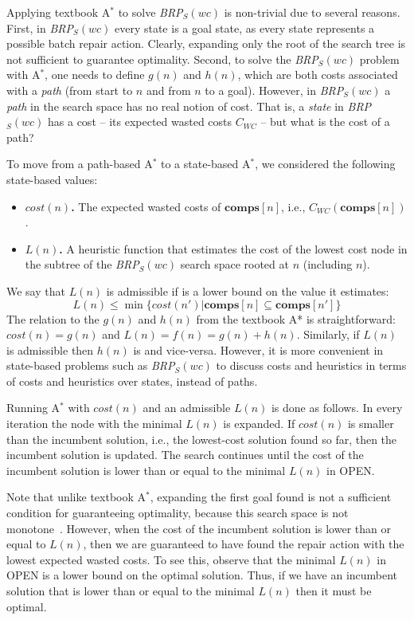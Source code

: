 \documentclass[review]{elsarticle}
\newcommand{\astar}{A$^*$}
\newcommand{\brpswc}{\textit{BRP$_S(wc)$}}
\newcommand{\comps}{\textbf{comps}}
\begin{document}
Applying textbook \astar{} to solve \brpswc{} is non-trivial due to several reasons. First, in \brpswc{} every state is a goal state, as every state represents a possible batch repair action. Clearly, expanding only the root of the search tree is not sufficient to guarantee optimality. 
Second, to solve the \brpswc{} problem with \astar{}, one needs to define $g(n)$ and $h(n)$, which are both costs associated with a \emph{path} (from start to $n$ and from $n$ to a goal). However, in \brpswc{} a \emph{path} in the search space has no real notion of cost. That is, a  \emph{state} in \brpswc{} has a cost -- its expected wasted costs $C_{WC}$ -- but what is the cost of a path?

To move from a path-based \astar{} to a state-based \astar{}, we considered the following state-based values:
\begin{itemize}
    \item \textbf{$cost(n)$.} The expected wasted costs of $\comps[n]$, i.e., $C_{WC}(\comps[n])$.
    \item \textbf{$L(n)$.} A heuristic function that estimates the cost of the lowest cost node in the subtree of the \brpswc{} search space rooted at $n$ (including $n$). 
\end{itemize}
We say that $L(n)$ is admissible if is a lower bound on the value it estimates: \begin{equation}
 L(n)\leq \min \{cost(n')| \comps[n] \subseteq \comps[n'] \}  \label{eq:admissibility}
\end{equation}
The relation to the $g(n)$ and $h(n)$ from the textbook A* is straightforward: $cost(n)=g(n)$ and $L(n)=f(n)=g(n)+h(n)$. Similarly, if $L(n)$ is admissible then $h(n)$ is and vice-versa. However, it is more convenient in state-based problems such as \brpswc{} to discuss costs and heuristics in terms of costs and heuristics over states, instead of paths.


Running \astar{} with $cost(n)$ and an admissible $L(n)$ is done as follows. In every iteration the node with the minimal $L(n)$ is expanded. 
If $cost(n)$ is smaller than the incumbent solution, i.e., the lowest-cost solution found so far, then the incumbent solution is updated. The search continues until 
the cost of the incumbent solution is lower than or equal to the minimal $L(n)$ in OPEN. 

Note that unlike textbook \astar{}, expanding the first goal found is not a sufficient condition for guaranteeing optimality, because this search space is not monotone~\cite{stern2014max}. However, when the cost of the incumbent solution is lower than or equal to $L(n)$, then we are guaranteed to have found the repair action with the lowest expected wasted costs. To see this, 
observe that the minimal $L(n)$ in OPEN is a lower bound on the optimal solution. 
Thus, if we have an incumbent solution that is lower than or equal to the minimal $L(n)$ then it must be optimal.  
\end{document}
